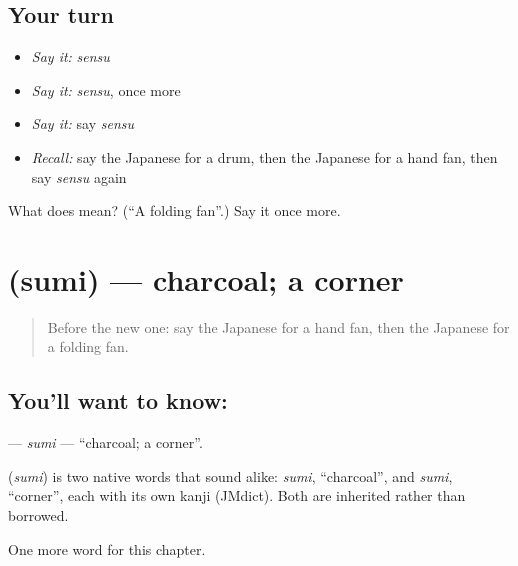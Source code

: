 \subsection*{Your turn}
\begin{itemize}
\raggedright
  \item \emph{Say it:} \emph{sensu}
  \item \emph{Say it:} \emph{sensu}, once more
  \item \emph{Say it:} say \emph{sensu}
  \item \emph{Recall:} say the Japanese for a drum, then the Japanese for a hand fan, then say \emph{sensu} again
\end{itemize}

\begin{tcolorbox}[breakable,colback=teal!4,colframe=teal!35!black,title={Before you move on}]
What does  mean? (\textquotedblleft{}A folding fan\textquotedblright{}.) Say it once more.
\end{tcolorbox}
\section[\texorpdfstring{\ja{すみ} (sumi)}{すみ (sumi)}]{ (sumi) — charcoal; a corner}

\label{lesson:JA-C67-sumi}



\begin{quote}
Before the new one: say the Japanese for a hand fan, then the Japanese for a folding fan.
\end{quote}

\subsection*{You'll want to know: }
\textbf{} — \emph{sumi} — \textquotedblleft{}charcoal; a corner\textquotedblright{}.

\begin{cousinweb}
\textbf{} (\emph{sumi}) is two native words that sound alike: \emph{sumi}, \textquotedblleft{}charcoal\textquotedblright{}, and \emph{sumi}, \textquotedblleft{}corner\textquotedblright{}, each with its own kanji (JMdict). Both are inherited rather than borrowed.
\end{cousinweb}

\begin{grammarlens}[title={What you've built}]
One more word for this chapter.
\end{grammarlens}

